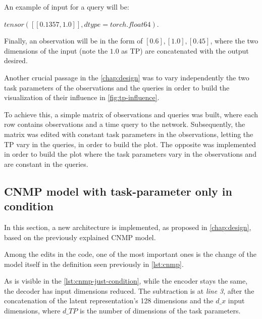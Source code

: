 An example of input for a query will be: 

$tensor([[0.1357, 1.0]], dtype=torch.float64)$. 

Finally, an observation will be in the form of $[0.6],[1.0],[0.45]$, where the two dimensions of the input (note the $1.0$ as TP) are concatenated with the output desired.

Another crucial passage in the \cref{chap:design} was to vary independently the two task parameters of the observations and the queries in order to build the visualization of their influence in \cref{fig:tp-influence}. 

To achieve this, a simple matrix of observations and queries was built, where each row contains observations and a time query to the network. Subsequently, the matrix was edited with constant task parameters in the observations, letting the TP vary in the queries, in order to build the plot. The opposite was implemented in order to build the plot where the task parameters vary in the observations and are constant in the queries. 


\subsection{CNMP model with task-parameter only in condition}
In this section, a new architecture is implemented, as proposed in \cref{chap:design}, based on the previously explained CNMP model. 

Among the edits in the code, one of the most important ones is the change of the model itself in the definition seen previously in \cref{lst:cnmp}. 



As is visible in the \cref{lst:cnmp-just-condition}, while the encoder stays the same, the decoder has input dimensions reduced. The subtraction is at \emph{line 3}, after the concatenation of the latent representation's 128 dimensions and the $d\_x$ input dimensions, where $d\_TP$ is the number of dimensions of the task parameters.



